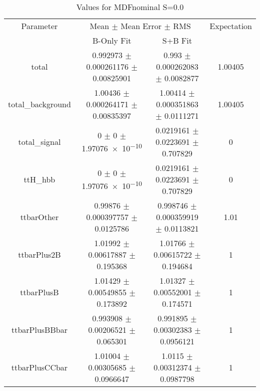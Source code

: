 \begin{table}
\centering
\caption{Values for MDFnominal S=0.0}
\begin{tabular}{cccc}
\toprule
Parameter & \multicolumn{2}{c}{Mean $\pm$ Mean Error $\pm$ RMS} & Expectation\\
 & B-Only Fit & S+B Fit & \\
\midrule
total & \num{0.992973} $\pm$ \num{0.000261176} $\pm$ \num{0.00825901} & \num{0.993} $\pm$ \num{0.000262083} $\pm$ \num{0.0082877} & \num{1.00405}\\
total\_background & \num{1.00436} $\pm$ \num{0.000264171} $\pm$ \num{0.00835397} & \num{1.00414} $\pm$ \num{0.000351863} $\pm$ \num{0.0111271} & \num{1.00405}\\
total\_signal & \num{0} $\pm$ \num{0} $\pm$ \num{1.97076e-10} & \num{0.0219161} $\pm$ \num{0.0223691} $\pm$ \num{0.707829} & \num{0}\\
ttH\_hbb & \num{0} $\pm$ \num{0} $\pm$ \num{1.97076e-10} & \num{0.0219161} $\pm$ \num{0.0223691} $\pm$ \num{0.707829} & \num{0}\\
ttbarOther & \num{0.99876} $\pm$ \num{0.000397757} $\pm$ \num{0.0125786} & \num{0.998746} $\pm$ \num{0.000359919} $\pm$ \num{0.0113821} & \num{1.01}\\
ttbarPlus2B & \num{1.01992} $\pm$ \num{0.00617887} $\pm$ \num{0.195368} & \num{1.01766} $\pm$ \num{0.00615722} $\pm$ \num{0.194684} & \num{1}\\
ttbarPlusB & \num{1.01429} $\pm$ \num{0.00549855} $\pm$ \num{0.173892} & \num{1.01327} $\pm$ \num{0.00552001} $\pm$ \num{0.174571} & \num{1}\\
ttbarPlusBBbar & \num{0.993908} $\pm$ \num{0.00206521} $\pm$ \num{0.065301} & \num{0.991895} $\pm$ \num{0.00302383} $\pm$ \num{0.0956121} & \num{1}\\
ttbarPlusCCbar & \num{1.01004} $\pm$ \num{0.00305685} $\pm$ \num{0.0966647} & \num{1.0115} $\pm$ \num{0.00312374} $\pm$ \num{0.0987798} & \num{1}\\
\bottomrule
\end{tabular}
\end{table}